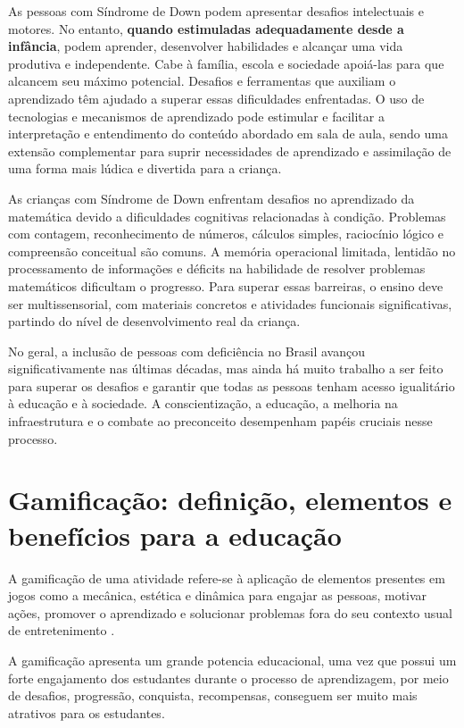 As pessoas com Síndrome de Down podem apresentar desafios intelectuais e motores. No entanto, \textbf{quando estimuladas adequadamente desde a infância}, podem aprender, desenvolver habilidades e alcançar uma vida produtiva e independente. Cabe à família, escola e sociedade apoiá-las para que alcancem seu máximo potencial. Desafios e ferramentas que auxiliam o aprendizado têm ajudado a superar essas dificuldades enfrentadas. O uso de tecnologias e mecanismos de aprendizado pode estimular e facilitar a interpretação e entendimento do conteúdo abordado em sala de aula, sendo uma extensão complementar para suprir necessidades de aprendizado e assimilação de uma forma mais lúdica e divertida para a criança. 

As crianças com Síndrome de Down enfrentam desafios no aprendizado da matemática devido a dificuldades cognitivas relacionadas à condição. Problemas com contagem, reconhecimento de números, cálculos simples, raciocínio lógico e compreensão conceitual são comuns. A memória operacional limitada, lentidão no processamento de informações e déficits na habilidade de resolver problemas matemáticos dificultam o progresso. Para superar essas barreiras, o ensino deve ser multissensorial, com materiais concretos e atividades funcionais significativas, partindo do nível de desenvolvimento real da criança.

No geral, a inclusão de pessoas com deficiência no Brasil avançou significativamente nas últimas décadas, mas ainda há muito trabalho a ser feito para superar os desafios e garantir que todas as pessoas tenham acesso igualitário à educação e à sociedade. A conscientização, a educação, a melhoria na infraestrutura e o combate ao preconceito desempenham papéis cruciais nesse processo.

\section{Gamificação: definição, elementos e benefícios para a educação}

A gamificação de uma atividade refere-se à aplicação de elementos presentes em jogos
como a mecânica, estética e dinâmica para engajar as pessoas, motivar ações, promover
o aprendizado e solucionar problemas fora do seu contexto usual de entretenimento \cite{kapp2012gamification}.

A gamificação apresenta um grande potencia educacional, uma vez que possui um forte engajamento dos estudantes durante o processo de aprendizagem, por meio de desafios, progressão, conquista, recompensas, conseguem ser muito mais atrativos para os estudantes.

